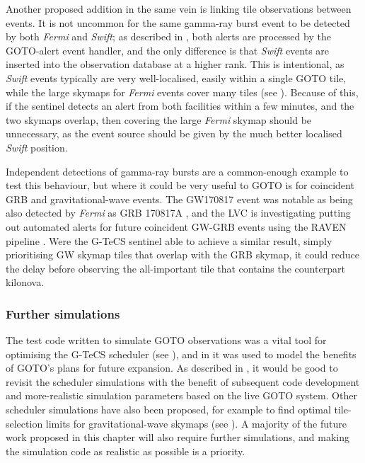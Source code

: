 \begin{colsection}
Another proposed addition in the same vein is linking tile observations between events. It is not uncommon for the same gamma-ray burst event to be detected by both \textit{Fermi} and \textit{Swift}; as described in , both alerts are processed by the GOTO-alert event handler, and the only difference is that \textit{Swift} events are inserted into the observation database at a higher rank. This is intentional, as \textit{Swift} events typically are very well-localised, easily within a single GOTO tile, while the large skymaps for \textit{Fermi} events cover many tiles (see ). Because of this, if the sentinel detects an alert from both facilities within a few minutes, and the two skymaps overlap, then covering the large \textit{Fermi} skymap should be unnecessary, as the event source should be given by the much better localised \textit{Swift} position.

Independent detections of gamma-ray bursts are a common-enough example to test this behaviour, but where it could be very useful to GOTO is for coincident GRB and gravitational-wave events. The GW170817 event was notable as being also detected by \textit{Fermi} as GRB 170817A \citep{GW170817_Fermi}, and the LVC is investigating putting out automated alerts for future coincident GW-GRB events using the RAVEN pipeline \citep{RAVEN, LVC_userguide}. Were the G-TeCS sentinel able to achieve a similar result, simply prioritising GW skymap tiles that overlap with the GRB skymap, it could reduce the delay before observing the all-important tile that contains the counterpart kilonova.

\subsubsection{Further simulations}

The test code written to simulate GOTO observations was a vital tool for optimising the G-TeCS scheduler (see ), and in  it was used to model the benefits of GOTO's plans for future expansion. As described in , it would be good to revisit the scheduler simulations with the benefit of subsequent code development and more-realistic simulation parameters based on the live GOTO system. Other scheduler simulations have also been proposed, for example to find optimal tile-selection limits for gravitational-wave skymaps (see ). A majority of the future work proposed in this chapter will also require further simulations, and making the simulation code as realistic as possible is a priority.


\end{colsection}
